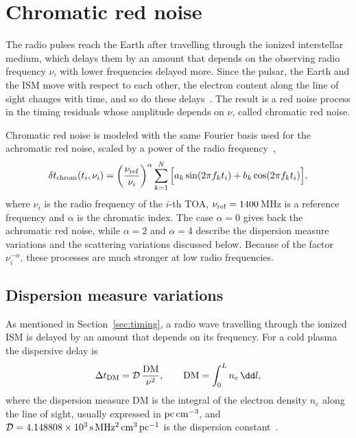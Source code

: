 \section{Chromatic red noise} \label{sec:chrom}

The radio pulses reach the Earth after travelling through the ionized
interstellar medium, which delays them by an amount that depends on the
observing radio frequency $\nu$, with lower frequencies delayed more. Since the
pulsar, the Earth and the ISM move with respect to each other, the electron
content along the line of sight changes with time, and so do these delays~\cite{Shaifullah2025}. The
result is a red noise process in the timing residuals whose amplitude depends
on $\nu$, called chromatic red noise.

Chromatic red noise is modeled with the same Fourier basis used for the
achromatic red noise, scaled by a power of the radio
frequency~\cite{Ferranti2025,Iraci2025},
\begin{equation}
    \delta t_{\rm chrom}(t_i, \nu_i) = \left(\frac{\nu_{\rm ref}}{\nu_i}\right)^{\alpha}
    \sum_{k=1}^{N} \Big[ a_k \sin(2\pi f_k t_i) + b_k \cos(2\pi f_k t_i) \Big],
    \label{eq:chrom}
\end{equation}
where $\nu_i$ is the radio frequency of the $i$-th TOA, $\nu_{\rm ref} =
1400$\,MHz is a reference frequency and $\alpha$ is the chromatic index. The
case $\alpha = 0$ gives back the achromatic red noise, while $\alpha = 2$ and
$\alpha = 4$ describe the dispersion measure variations and the scattering
variations discussed below. Because of the factor $\nu_i^{-\alpha}$, these
processes are much stronger at low radio frequencies.

\subsection{Dispersion measure variations} \label{sec:dm}

As mentioned in Section~\ref{sec:timing}, a radio wave travelling through the
ionized ISM is delayed by an amount that depends on its frequency. For a cold
plasma the dispersive delay is
\begin{equation}
    \Delta t_{\rm DM} = \mathcal{D}\,\frac{\rm DM}{\nu^2},
    \qquad
    {\rm DM} = \int_0^L n_e\,\dd l,
    \label{eq:DM}
\end{equation}
where the dispersion measure DM is the integral of the electron density $n_e$
along the line of sight, usually expressed in ${\rm pc\,cm^{-3}}$, and
$\mathcal{D} = 4.148808\times10^{3}\,{\rm s\,MHz^2\,cm^3\,pc^{-1}}$ is the
dispersion constant~\cite{Shaifullah2025}.

